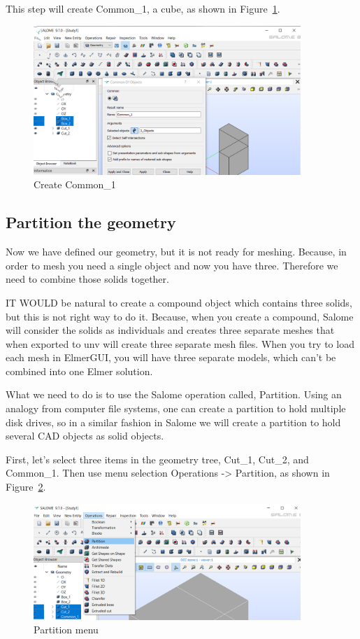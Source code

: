 This step will create Common\_1, a cube, as shown in Figure~\ref{fg:salome-10}.

\begin{figure}[H]
\centering
\includegraphics[width=0.9\textwidth]{Salome-10}
\caption{Create Common\_1}\label{fg:salome-10}
\end{figure}

\subsection{Partition the geometry}

Now we have defined our geometry, but it is not ready for meshing. Because, in order to mesh you need a single object and now you have three. Therefore we need to combine those solids together.

IT WOULD be natural to create a compound object which contains three solids, but this is not right way to do it. Because, when you create a compound, Salome will consider the solids as individuals and creates three separate meshes that when exported to unv will create three separate mesh files.  When you try to load each mesh in ElmerGUI, you will have three separate models, which can't be combined into one Elmer solution.

What we need to do is to use the Salome operation called, Partition.  Using an analogy from computer file systems, one can create a partition to hold multiple disk drives, so in a similar fashion in Salome we will create a partition to hold several CAD objects as solid objects.

First, let's select three items in the geometry tree, Cut\_1, Cut\_2, and Common\_1.  Then use menu selection Operations -> Partition, as shown in Figure~\ref{fg:salome-11}.

\begin{figure}[H]
\centering
\includegraphics[width=0.9\textwidth]{Salome-11}
\caption{Partition menu}\label{fg:salome-11}
\end{figure}


